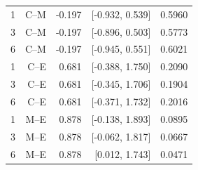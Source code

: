 \begin{longtable}{@{}lrrrr@{}}
1 & C--M & -0.197 & [-0.932, 0.539] & 0.5960\\

3 & C--M & -0.197 & [-0.896, 0.503] & 0.5773\\

6 & C--M & -0.197 & [-0.945, 0.551] & 0.6021\\

1 & C--E & 0.681 & [-0.388, 1.750] & 0.2090\\

3 & C--E & 0.681 & [-0.345, 1.706] & 0.1904\\

6 & C--E & 0.681 & [-0.371, 1.732] & 0.2016\\

1 & M--E & 0.878 & [-0.138, 1.893] & 0.0895\\

3 & M--E & 0.878 & [-0.062, 1.817] & 0.0667\\

6 & M--E & 0.878 & [0.012, 1.743] & 0.0471\\

\end{longtable}\endgroup

\begingroup\footnotesize\setlength{\tabcolsep}{4pt}\renewcommand{\arraystretch}{1.1}

